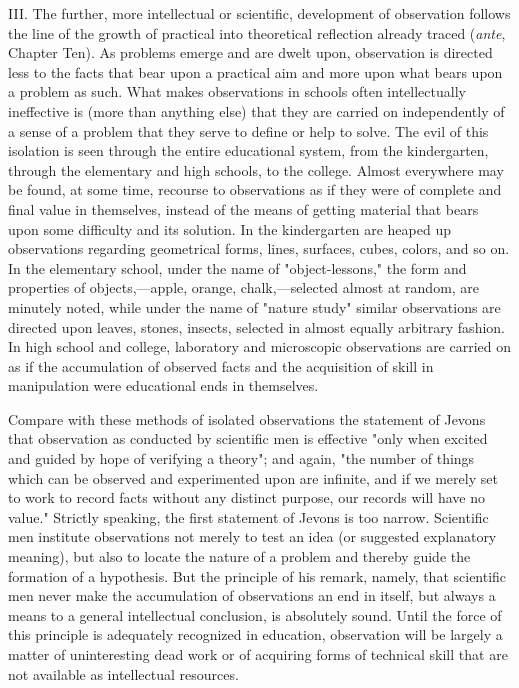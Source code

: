 \documentclass[letterpaper]{book}
\begin{document}
III. The further, more intellectual or scientific, development of
observation follows the line of the growth of practical into theoretical
reflection already traced (\emph{ante}, Chapter Ten). As problems emerge and are dwelt upon, observation is directed
less to the facts that bear upon a practical aim and more upon what
bears upon a problem as such. What makes observations in schools often
intellectually ineffective is (more than anything else) that they are
carried on independently of a sense of a problem that they serve to
define or help to solve. The evil of this isolation is seen through the
entire educational system, from the kindergarten, through the elementary
and high schools, to the college. Almost everywhere may be found, at
some time, recourse to observations as if they were of complete and
final value in themselves, instead of the
means
of getting material that bears upon some difficulty and its solution. In
the kindergarten are heaped up observations regarding geometrical forms,
lines, surfaces, cubes, colors, and so on. In the elementary school,
under the name of "object-lessons," the form and properties of
objects,---apple, orange, chalk,---selected almost at random, are
minutely noted, while under the name of "nature study" similar
observations are directed upon leaves, stones, insects, selected in
almost equally arbitrary fashion. In high school and college, laboratory
and microscopic observations are carried on as if the accumulation of
observed facts and the acquisition of skill in manipulation were
educational ends in themselves.

Compare with these methods of isolated observations the statement of
Jevons that observation as conducted by scientific men is effective
"only when excited and guided by hope of verifying a theory"; and again,
"the number of things which can be observed and experimented upon are
infinite, and if we merely set to work to record facts without any
distinct purpose, our records will have no value." Strictly speaking,
the first statement of Jevons is too narrow. Scientific men institute
observations not merely to test an idea (or suggested explanatory
meaning), but also to locate the nature of a problem and thereby guide
the formation of a hypothesis. But the principle of his remark, namely,
that scientific men never make the accumulation of observations an end
in itself, but always a means to a general intellectual conclusion, is
absolutely sound. Until the force of this principle is adequately
recognized in education, observation will be largely a matter of
uninteresting dead work or of acquiring forms of technical skill that
are not available as intellectual
resources.
\end{document}
